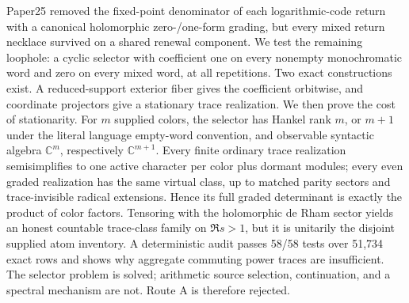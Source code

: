 Paper25 removed the fixed-point denominator of each logarithmic-code return
with a canonical holomorphic zero-/one-form grading, but every mixed return
necklace survived on a shared renewal component.  We test the remaining
loophole: a cyclic selector with coefficient one on every nonempty
monochromatic word and zero on every mixed word, at all repetitions.  Two
exact constructions exist.  A reduced-support exterior fiber gives the
coefficient orbitwise, and coordinate projectors give a stationary trace
realization.  We then prove the cost of stationarity.  For \(m\) supplied
colors, the selector has Hankel rank \(m\), or \(m+1\) under the literal
language empty-word convention, and observable syntactic algebra
\(\mathbb C^m\), respectively \(\mathbb C^{m+1}\).  Every finite ordinary
trace realization semisimplifies to one active character per color plus
dormant modules; every even graded realization has the same virtual class,
up to matched parity sectors and trace-invisible radical extensions.  Hence
its full graded determinant is exactly the product of color factors.
Tensoring with the holomorphic de Rham sector yields an honest countable
trace-class family on \(\Re s>1\), but it is unitarily the disjoint supplied
atom inventory.  A deterministic audit passes 58/58 tests over 51,734 exact
rows and shows why aggregate commuting power traces are insufficient.  The
selector problem is solved; arithmetic source selection, continuation, and a
spectral mechanism are not.  Route A is therefore rejected.
